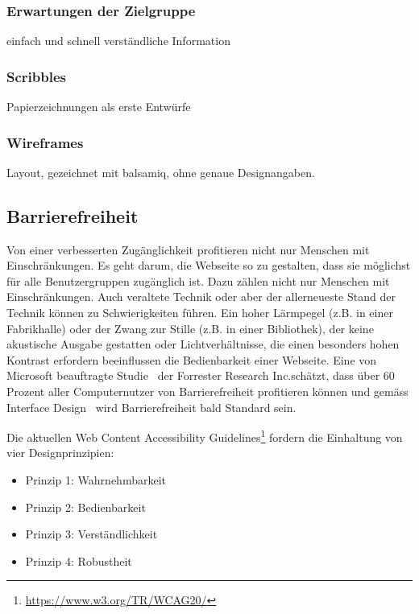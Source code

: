 \subsubsection*{Erwartungen der Zielgruppe}
einfach und schnell verständliche Information
\subsubsection*{Scribbles}
Papierzeichnungen als erste Entwürfe
\subsubsection*{Wireframes}
Layout, gezeichnet mit balsamiq, ohne genaue Designangaben.





\subsection{Barrierefreiheit}

Von einer verbesserten Zugänglichkeit profitieren nicht nur Menschen mit Einschränkungen. Es geht darum, die Webseite so zu gestalten, dass sie möglichst für alle Benutzergruppen zugänglich ist. Dazu zählen nicht nur Menschen mit Einschränkungen. Auch veraltete Technik oder aber der allerneueste Stand der Technik können zu Schwierigkeiten führen. Ein hoher Lärmpegel (z.B. in einer Fabrikhalle) oder der Zwang zur Stille (z.B. in einer Bibliothek), der keine akustische Ausgabe gestatten oder Lichtverhältnisse, die einen besonders hohen Kontrast erfordern beeinflussen die Bedienbarkeit einer Webseite. Eine von Microsoft beauftragte Studie~\cite{ForresterResearch2004E:Abilities} der \flqq Forrester Research Inc.\frqq schätzt, dass über 60 Prozent aller Computernutzer von Barrierefreiheit profitieren können und gemäss \flqq Interface Design\frqq ~\cite{ThesmannStephan2016ID:U} wird Barrierefreiheit bald Standard sein.

Die aktuellen Web Content Accessibility Guidelines\footnote{ \url{https://www.w3.org/TR/WCAG20/}} fordern die Einhaltung von vier Designprinzipien:

\begin{itemize}  
\item Prinzip 1: Wahrnehmbarkeit 
\item Prinzip 2: Bedienbarkeit
\item Prinzip 3: Verständlichkeit
\item Prinzip 4: Robustheit
\end{itemize}

